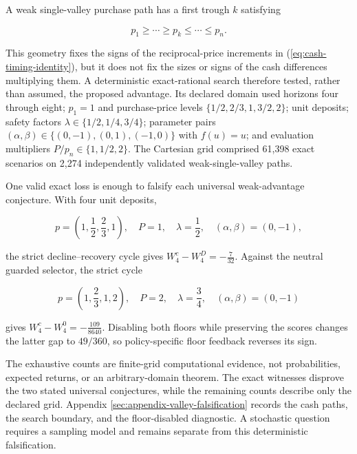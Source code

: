 \documentclass[12pt,a4paper,oneside]{report}
\begin{document}
A weak single-valley purchase path has a first trough $k$ satisfying

\begin{equation}
  p_1\geq\cdots\geq p_k\leq\cdots\leq p_n.
  \label{eq:weak-single-valley}
\end{equation}

This geometry fixes the signs of the reciprocal-price increments in
(\ref{eq:cash-timing-identity}), but it does not fix the sizes or signs of the
cash differences multiplying them. A deterministic exact-rational search
therefore tested, rather than assumed, the proposed advantage. Its declared
domain used horizons four through eight; $p_1=1$ and purchase-price levels
$\{1/2,2/3,1,3/2,2\}$; unit deposits; safety factors
$\lambda\in\{1/2,1/4,3/4\}$; parameter pairs
$(\alpha,\beta)\in\{(0,-1),(0,1),(-1,0)\}$ with $f(u)=u$; and evaluation
multipliers $P/p_n\in\{1,1/2,2\}$. The Cartesian grid comprised 61,398 exact
scenarios on 2,274 independently validated weak-single-valley paths.

One valid exact loss is enough to falsify each universal weak-advantage
conjecture. With four unit deposits,

\begin{equation}
  p=\left(1,\frac12,\frac23,1\right),\quad
  P=1,\quad\lambda=\frac12,\quad(\alpha,\beta)=(0,-1),
  \label{eq:valley-dca-loss-inputs}
\end{equation}

the strict decline--recovery cycle gives
$W_4^c-W_4^D=-\frac7{32}$. Against the neutral guarded selector, the strict
cycle

\begin{equation}
  p=\left(1,\frac23,1,2\right),\quad
  P=2,\quad\lambda=\frac34,\quad(\alpha,\beta)=(0,-1)
  \label{eq:valley-neutral-loss-inputs}
\end{equation}

gives $W_4^c-W_4^0=-\frac{109}{8640}$. Disabling both floors while preserving
the scores changes the latter gap to $49/360$, so policy-specific floor
feedback reverses its sign.

The exhaustive counts are finite-grid computational evidence, not
probabilities, expected returns, or an arbitrary-domain theorem. The exact
witnesses disprove the two stated universal conjectures, while the remaining
counts describe only the declared grid. Appendix
\ref{sec:appendix-valley-falsification} records the cash paths, the search
boundary, and the floor-disabled diagnostic. A stochastic question requires a
sampling model and remains separate from this deterministic falsification.
\end{document}
